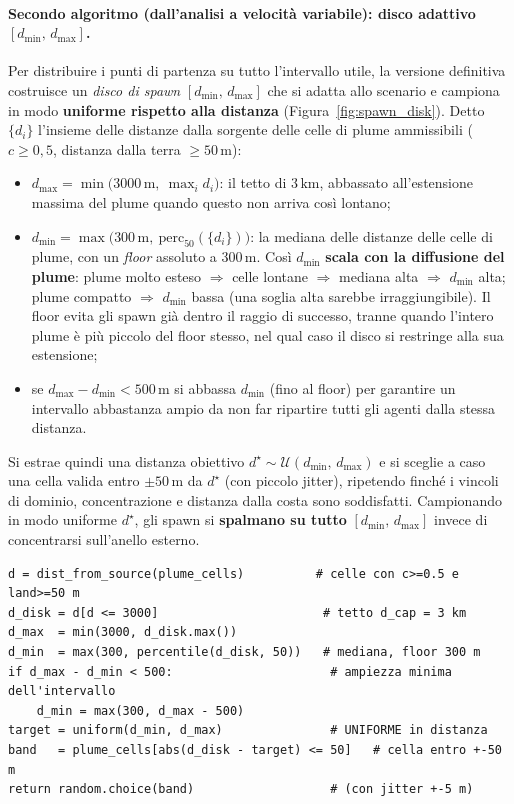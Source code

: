 \paragraph{Secondo algoritmo (dall'analisi a velocit\`a variabile): disco adattivo $[d_{\min},\,d_{\max}]$.}
Per distribuire i punti di partenza su tutto l'intervallo utile, la versione definitiva
costruisce un \emph{disco di spawn} $[d_{\min},\,d_{\max}]$ che si adatta allo scenario e
campiona in modo \textbf{uniforme rispetto alla distanza} (Figura~\ref{fig:spawn_disk}).
Detto $\{d_i\}$ l'insieme delle distanze dalla sorgente delle celle di plume ammissibili
($c \geq 0{,}5$, distanza dalla terra $\geq 50\,\text{m}$):
\begin{itemize}
  \item $d_{\max} = \min\!\big(3000\,\text{m},\ \max_i d_i\big)$: il tetto di $3\,\text{km}$,
        abbassato all'estensione massima del plume quando questo non arriva cos\`i lontano;
  \item $d_{\min} = \max\!\big(300\,\text{m},\ \mathrm{perc}_{50}(\{d_i\})\big)$: la mediana
        delle distanze delle celle di plume, con un \emph{floor} assoluto a $300\,\text{m}$.
        Cos\`i $d_{\min}$ \textbf{scala con la diffusione del plume}: plume molto esteso
        $\Rightarrow$ celle lontane $\Rightarrow$ mediana alta $\Rightarrow$ $d_{\min}$ alta;
        plume compatto $\Rightarrow$ $d_{\min}$ bassa (una soglia alta sarebbe
        irraggiungibile). Il floor evita gli spawn gi\`a dentro il raggio di successo, tranne
        quando l'intero plume \`e pi\`u piccolo del floor stesso, nel qual caso il disco si
        restringe alla sua estensione;
  \item se $d_{\max}-d_{\min} < 500\,\text{m}$ si abbassa $d_{\min}$ (fino al floor) per
        garantire un intervallo abbastanza ampio da non far ripartire tutti gli agenti dalla
        stessa distanza.
\end{itemize}
Si estrae quindi una distanza obiettivo $d^\star \sim \mathcal{U}(d_{\min},\,d_{\max})$ e si
sceglie a caso una cella valida entro $\pm 50\,\text{m}$ da $d^\star$ (con piccolo jitter),
ripetendo finch\'e i vincoli di dominio, concentrazione e distanza dalla costa sono
soddisfatti. Campionando in modo uniforme $d^\star$, gli spawn si \textbf{spalmano su tutto}
$[d_{\min},\,d_{\max}]$ invece di concentrarsi sull'anello esterno.

\begin{lstlisting}
d = dist_from_source(plume_cells)          # celle con c>=0.5 e land>=50 m
d_disk = d[d <= 3000]                       # tetto d_cap = 3 km
d_max  = min(3000, d_disk.max())
d_min  = max(300, percentile(d_disk, 50))   # mediana, floor 300 m
if d_max - d_min < 500:                      # ampiezza minima dell'intervallo
    d_min = max(300, d_max - 500)
target = uniform(d_min, d_max)               # UNIFORME in distanza
band   = plume_cells[abs(d_disk - target) <= 50]   # cella entro +-50 m
return random.choice(band)                   # (con jitter +-5 m)
\end{lstlisting}

